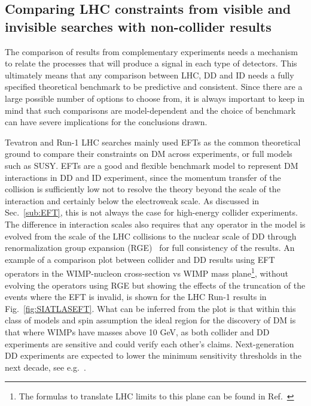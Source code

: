 \subsection{Comparing LHC constraints from visible and invisible searches with non-collider results}

The comparison of results from complementary experiments needs a mechanism to relate the processes
that will produce a signal in each type of detectors. This ultimately means that any comparison between LHC, DD and ID
needs a fully specified theoretical benchmark to be predictive and consistent. Since there are a large possible number of options to choose from, it is always important to keep in mind that such comparisons are model-dependent and the choice of benchmark can have severe implications for the conclusions drawn. 


Tevatron and Run-1 LHC searches mainly used EFTs as the common theoretical ground to compare their constraints on DM across experiments, or full models such as SUSY. EFTs are a good and flexible benchmark model to represent DM interactions in DD and ID experiment, since the momentum transfer of the collision is sufficiently low not to resolve the theory beyond the scale of the interaction and certainly below the electroweak scale. As discussed in Sec.~\ref{sub:EFT}, this is not always the case for high-energy collider experiments. The difference in interaction scales also requires that any operator in the model is evolved from the scale of the LHC collisions to the nuclear scale of DD through renormalization group expansion (RGE)~\cite{DEramo:2014nmf} for full consistency of the results. %
An example of a comparison plot between collider and DD results using EFT operators in the WIMP-nucleon cross-section vs WIMP mass plane\footnote{The formulas to translate LHC limits to this plane can be found in Ref.~\cite{Goodman:2010ku}}, without evolving the operators using RGE but showing the effects of the truncation of the events where the EFT is invalid, is shown for the LHC Run-1 results in Fig.~\ref{fig:SIATLASEFT}. %
What can be inferred from the plot is that within this class of models and spin assumption %
the ideal region for the discovery of DM is that where WIMPs have masses above 10 GeV, as both collider and DD experiments are sensitive and could verify each other's claims. Next-generation DD experiments are expected to lower the minimum sensitivity thresholds in the next decade, see e.g.~\cite{Agnese:2016cpb}. 

